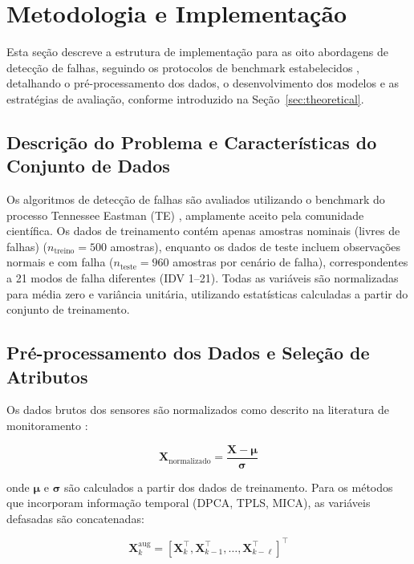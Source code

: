 \documentclass[journal]{IEEEtran}
\begin{document}
\section{Metodologia e Implementação}
\label{sec:methodology}

Esta seção descreve a estrutura de implementação para as oito abordagens de detecção de falhas, seguindo os protocolos de benchmark estabelecidos \cite{yin2012}, detalhando o pré-processamento dos dados, o desenvolvimento dos modelos e as estratégias de avaliação, conforme introduzido na Seção~\ref{sec:theoretical}.

\subsection{Descrição do Problema e Características do Conjunto de Dados}
\label{subsec:problem_description}

Os algoritmos de detecção de falhas são avaliados utilizando o benchmark do processo Tennessee Eastman (TE) \cite{downs_and_vogel_1993, yin2012}, amplamente aceito pela comunidade científica. Os dados de treinamento contém apenas amostras nominais (livres de falhas) ($n_{\text{treino}} = 500$ amostras), enquanto os dados de teste incluem observações normais e com falha ($n_{\text{teste}} = 960$ amostras por cenário de falha), correspondentes a 21 modos de falha diferentes (IDV 1--21). Todas as variáveis são normalizadas para média zero e variância unitária, utilizando estatísticas calculadas a partir do conjunto de treinamento.

\subsection{Pré-processamento dos Dados e Seleção de Atributos}
\label{subsec:preprocessing}

Os dados brutos dos sensores são normalizados como descrito na literatura de monitoramento \cite{yin2012}:

\begin{equation}
\mathbf{X}_{\text{normalizado}} = \frac{\mathbf{X} - \boldsymbol{\mu}}{\boldsymbol{\sigma}}
\label{eq:normalization}
\end{equation}

onde $\boldsymbol{\mu}$ e $\boldsymbol{\sigma}$ são calculados a partir dos dados de treinamento. Para os métodos que incorporam informação temporal (DPCA, TPLS, MICA), as variáveis defasadas são concatenadas:

\begin{equation}
\mathbf{X}^{\text{aug}}_k = [\mathbf{X}_k^\top, \mathbf{X}_{k-1}^\top, \ldots, \mathbf{X}_{k-\ell}^\top]^\top
\label{eq:augmented_features}
\end{equation}
\end{document}
